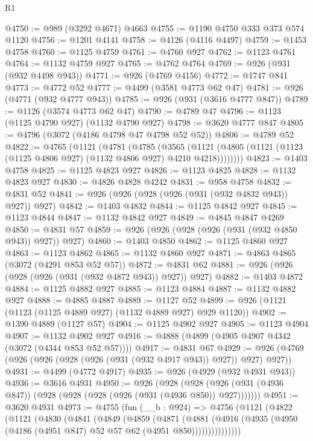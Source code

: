 \begin{lexlean}{R1}
\begin{coremodule}
@4750 := @989 (@3292 @4671) @4663
@4755 := @1190 @4750 @333 @373 @574 @1120
@4756 := @1201 @4141
@4758 := @4126 (@4116 @4497)
@4759 := @1453 @4758
@4760 := @1125 @4759
@4761 := @4760 @927
@4762 := @1123 @4761
@4764 := @1132 @4759 @927
@4765 := @4762 @4764
@4769 := @926 (@931 (@932 @4498 @943))
@4771 := @926 (@4769 @4156)
@4772 := @1747 @841
@4773 := @4772 @52
@4777 := @4499 (@3581 @4773 @62 @47)
@4781 := @926 (@4771 (@932 @4777 @943))
@4785 := @926 (@931 (@3616 @4777 @847))
@4789 := @1126 (@3574 @4773 @62 @47)
@4790 := @4789 @47
@4796 := @1123 (@1125 @4790 @927) (@1132 @4790 @927)
@4798 := @3620 @4777 @847
@4805 := @4796 (@3072 (@4186 @4798 @47 @4798 @52 @52))
@4806 := @4789 @52
@4822 := @4765
    (@1121
      (@4781
        (@4785
          (@3565
            (@1121 (@4805 (@1121 (@1123 (@1125 @4806 @927) (@1132 @4806 @927) @4210 @4218))))))))
@4823 := @1403 @4758
@4825 := @1125 @4823 @927
@4826 := @1123 @4825
@4828 := @1132 @4823 @927
@4830 := @4826 @4828 @4242
@4831 := @958 @4758
@4832 := @4831 @52
@4841 := @926 (@926 (@928 (@926 (@931 (@932 @4832 @943)) @927)) @927)
@4842 := @1403 @4832
@4844 := @1125 @4842 @927
@4845 := @1123 @4844
@4847 := @1132 @4842 @927
@4849 := @4845 @4847 @4269
@4850 := @4831 @57
@4859 := @926 (@926 (@928 (@926 (@931 (@932 @4850 @943)) @927)) @927)
@4860 := @1403 @4850
@4862 := @1125 @4860 @927
@4863 := @1123 @4862
@4865 := @1132 @4860 @927
@4871 := @4863 @4865 (@3072 (@4291 @853 @52 @57))
@4872 := @4831 @62
@4881 := @926 (@926 (@928 (@926 (@931 (@932 @4872 @943)) @927)) @927)
@4882 := @1403 @4872
@4884 := @1125 @4882 @927
@4885 := @1123 @4884
@4887 := @1132 @4882 @927
@4888 := @4885 @4887
@4889 := @1127 @52
@4899 := @926 (@1121 (@1123 (@1125 @4889 @927) (@1132 @4889 @927) @929 @1120))
@4902 := @1390 @4889 (@1127 @57)
@4904 := @1125 @4902 @927
@4905 := @1123 @4904
@4907 := @1132 @4902 @927
@4916 := @4888 (@4899 (@4905 @4907 @4342 (@3072 (@4344 @853 @52 @57))))
@4917 := @4831 @67
@4929 := @926 (@4769 (@926 (@926 (@928 (@926 (@931 (@932 @4917 @943)) @927)) @927) @927))
@4931 := @4499 (@4772 @4917)
@4935 := @926 (@4929 (@932 @4931 @943))
@4936 := @3616 @4931
@4950 := @926
    (@928 (@928 (@926 (@931 (@4936 @847)) (@928 (@928 (@928 (@926 (@931 (@4936 @850)) @927)))))))
@4951 := @3620 @4931
@4973 := @4755
    (fun (__b : @924) =>
    @4756
      (@1121
        (@4822
          (@1121
            (@4830
              (@4841
                (@4849
                  (@4859
                    (@4871
                      (@4881
                        (@4916
                          (@4935 (@4950 (@4186 (@4951 @847) @52 @57 @62 (@4951 @850)))))))))))))))

\end{coremodule}
\end{lexlean}
